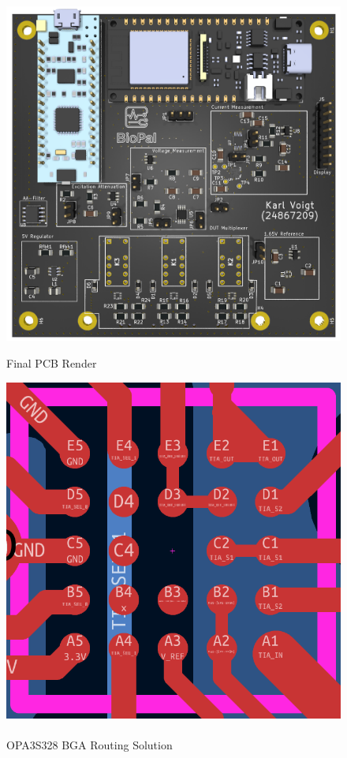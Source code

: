 \begin{figure}[H]
    \centering
    \begin{minipage}{0.4\textwidth}
        \centering
        \includegraphics[width=\textwidth]{BioPal_render.png}
        \caption{Final PCB Render}
        \label{fig:final_pcb}
    \end{minipage}\hfill
    \begin{minipage}{0.35\textwidth}
        \centering
        \includegraphics[width=\textwidth]{BGA_Routing.png}
        \caption{\\OPA3S328 BGA Routing Solution}
        \label{fig:bga_routing}
    \end{minipage}
\end{figure}


